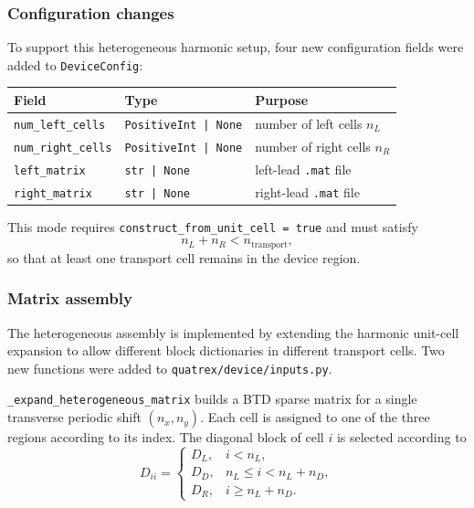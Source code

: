 \subsubsection{Configuration changes}

To support this heterogeneous harmonic setup, four new configuration
fields were added to \texttt{DeviceConfig}:
\begin{center}
\begin{tabular}{lll}
  \toprule
  Field & Type & Purpose \\
  \midrule
  \texttt{num\_left\_cells}  & \texttt{PositiveInt | None} & number of left cells $n_L$ \\
  \texttt{num\_right\_cells} & \texttt{PositiveInt | None} & number of right cells $n_R$ \\
  \texttt{left\_matrix}      & \texttt{str | None}         & left-lead \texttt{.mat} file \\
  \texttt{right\_matrix}     & \texttt{str | None}         & right-lead \texttt{.mat} file \\
  \bottomrule
\end{tabular}
\end{center}
This mode requires
\texttt{construct\_from\_unit\_cell = true} and must satisfy
\begin{equation}
  n_L + n_R < n_\mathrm{transport},
\end{equation}
so that at least one transport cell remains in the device region.

\subsubsection{Matrix assembly}

The heterogeneous assembly is implemented by extending the harmonic
unit-cell expansion to allow different block dictionaries in different
transport cells.  Two new functions were added to
\texttt{quatrex/device/inputs.py}.

\texttt{\_expand\_heterogeneous\_matrix} builds a BTD sparse matrix for
a single transverse periodic shift $(n_x,n_y)$.  Each cell is assigned
to one of the three regions according to its index.  The diagonal block
of cell $i$ is selected according to
\begin{equation}
  D_{ii} =
  \begin{cases}
    D_L, & i < n_L, \\
    D_D, & n_L \le i < n_L+n_D, \\
    D_R, & i \ge n_L+n_D.
  \end{cases}
\end{equation}

